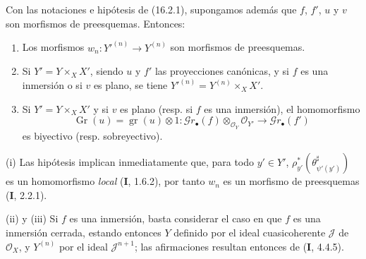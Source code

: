 \begin{proposition}[16.2.2]
\label{IV.16.2.2}
Con las notaciones e hipótesis de \textup{(16.2.1)}, supongamos además que $f$, $f'$,
$u$ y $v$ son morfismos de preesquemas. Entonces:
\begin{enumerate}
\item[\textup{(i)}] Los morfismos $w_n:Y'^{(n)}\to Y^{(n)}$ son morfismos de
preesquemas.
\item[\textup{(ii)}] Si $Y'=Y\times_X X'$, siendo $u$ y $f'$ las proyecciones
canónicas, y si $f$ es una inmersión \textup{o} si $v$ es plano, se tiene
$Y'^{(n)}=Y^{(n)}\times_X X'$.
\item[\textup{(iii)}] Si $Y'=Y\times_X X'$ y si $v$ es plano \textup{(resp.} si $f$ es una
inmersión\textup{)}, el homomorfismo
\[
  \operatorname{Gr}(u)=\operatorname{gr}(u)\otimes 1:
  \mathscr{G}r_\bullet(f)\otimes_{\mathcal{O}_Y}\mathcal{O}_{Y'}
  \longrightarrow\mathscr{G}r_\bullet(f')
\]
es biyectivo \textup{(resp.} sobreyectivo\textup{)}.
\end{enumerate}
\end{proposition}

\noindent(i) Las hipótesis implican inmediatamente que, para todo $y'\in Y'$,
$\rho_{y'}^*(\theta_{\psi'(y')}^\sharp)$ es un homomorfismo \emph{local} (\textbf I, 1.6.2),
por tanto $w_n$ es un morfismo de preesquemas (\textbf I, 2.2.1).

\noindent(ii) y (iii) Si $f$ es una inmersión, basta considerar el caso en que
$f$ es una inmersión cerrada, estando entonces $Y$ definido por el ideal
cuasicoherente $\mathscr J$ de $\mathcal{O}_X$, y $Y^{(n)}$ por el ideal
$\mathscr J^{n+1}$; las afirmaciones resultan entonces de (\textbf I, 4.4.5).

